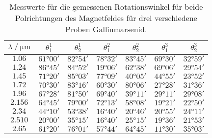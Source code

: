 \begin{table}[H]
    \centering
    \caption{Messwerte für die gemessenen Rotationswinkel für beide Polrichtungen des Magnetfeldes für drei verschiedene Proben Galliumarsenid.}
    \label{tab:Winkeldaten}
    \begin{tabular}{S[table-format=1.3] | c c |c c | c c}
    \toprule
      {$\lambda \mathbin{/} \unit{\micro\meter}$ } & {$\theta^1_1$} & {$\theta^1_2$} & {$\theta^2_1$} & {$\theta^2_2$} & {$\theta^3_1$} & {$\theta^3_2$} \\
    \midrule
    {$1.06$}    & {$61°00'$}&   {$82°54'$}&   {$78°32'$}&   {$83°45'$}&   {$69°30'$}&  {$32°59'$} \\
    {$1.24$}    & {$86°45'$}&   {$84°52'$}&   {$19°06'$}&   {$62°38'$}&   {$69°06'$}&  {$29°54'$} \\
    {$1.45$}    & {$71°20'$}&   {$85°03'$}&   {$77°09'$}&   {$40°05'$}&   {$44°55'$}&  {$23°52'$} \\
    {$1.72$}    & {$70°30'$}&   {$83°16'$}&   {$60°30'$}&   {$80°06'$}&   {$27°28'$}&  {$31°36'$} \\
    {$1.96$}    & {$67°28'$}&   {$81°50'$}&   {$69°40'$}&   {$39°11'$}&   {$29°11'$}&  {$29°08'$} \\
    {$2.156$}   & {$64°45'$}&   {$79°00'$}&   {$72°13'$}&   {$58°08'$}&   {$19°21'$}&  {$22°50'$} \\
    {$2.34$}    & {$44°10'$}&   {$53°38'$}&   {$16°40'$}&   {$20°46'$}&   {$20°55'$}&  {$24°11'$} \\
    {$2.510$}   & {$20°00'$}&   {$35°15'$}&   {$16°40'$}&   {$25°15'$}&   {$19°36'$}&  {$21°53'$} \\
    {$2.65$}    & {$61°20'$}&   {$76°01'$}&   {$57°44'$}&   {$64°45'$}&   {$11°30'$}&  {$35°03'$} \\
    \bottomrule
    \end{tabular}
\end{table}
